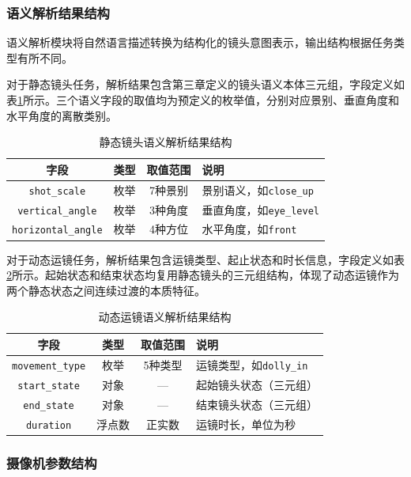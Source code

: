 \subsubsection{语义解析结果结构}

语义解析模块将自然语言描述转换为结构化的镜头意图表示，输出结构根据任务类型有所不同。

对于静态镜头任务，解析结果包含第三章定义的镜头语义本体三元组，字段定义如表\ref{tab:static_intent}所示。三个语义字段的取值均为预定义的枚举值，分别对应景别、垂直角度和水平角度的离散类别。

\begin{table}[htbp]
\centering
\caption{静态镜头语义解析结果结构}
\label{tab:static_intent}
\begin{tabular}{cccp{5cm}}
\toprule
字段 & 类型 & 取值范围 & 说明 \\
\midrule
\texttt{shot\_scale} & 枚举 & 7种景别 & 景别语义，如\texttt{close\_up} \\
\texttt{vertical\_angle} & 枚举 & 3种角度 & 垂直角度，如\texttt{eye\_level} \\
\texttt{horizontal\_angle} & 枚举 & 4种方位 & 水平角度，如\texttt{front} \\
\bottomrule
\end{tabular}
\end{table}

对于动态运镜任务，解析结果包含运镜类型、起止状态和时长信息，字段定义如表\ref{tab:dynamic_intent}所示。起始状态和结束状态均复用静态镜头的三元组结构，体现了动态运镜作为两个静态状态之间连续过渡的本质特征。

\begin{table}[htbp]
\centering
\caption{动态运镜语义解析结果结构}
\label{tab:dynamic_intent}
\begin{tabular}{cccp{5cm}}
\toprule
字段 & 类型 & 取值范围 & 说明 \\
\midrule
\texttt{movement\_type} & 枚举 & 5种类型 & 运镜类型，如\texttt{dolly\_in} \\
\texttt{start\_state} & 对象 & — & 起始镜头状态（三元组） \\
\texttt{end\_state} & 对象 & — & 结束镜头状态（三元组） \\
\texttt{duration} & 浮点数 & 正实数 & 运镜时长，单位为秒 \\
\bottomrule
\end{tabular}
\end{table}

\subsubsection{摄像机参数结构}


